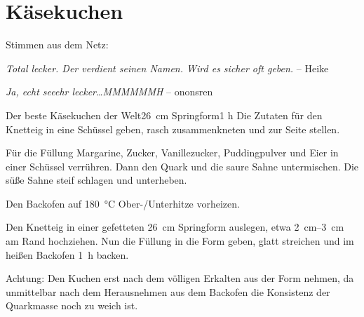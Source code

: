 \section{Käsekuchen}
Stimmen aus dem Netz:\autocite{blondeangel_2008}

\textit{Total lecker. Der verdient seinen Namen. Wird es sicher oft geben.} -- Heike

\textit{Ja, echt seeehr lecker\dots MMMMMMH} -- ononsren

\begin{recipe}{Der beste Käsekuchen der Welt}{\SI{26}{\centi\meter} Springform}{1 h}
    Die Zutaten für den Knetteig in eine Schüssel geben, rasch zusammenkneten und zur Seite stellen.

    Für die Füllung Margarine, Zucker, Vanillezucker, Puddingpulver und Eier in einer Schüssel verrühren. Dann den Quark und die saure Sahne untermischen. Die süße Sahne steif schlagen und unterheben.

    \freeform Den Backofen auf \SI{180}{\celsius} Ober-/Unterhitze vorheizen.

    Den Knetteig in einer gefetteten \SI{26}{\centi\meter} Springform auslegen, etwa \SIrange{2}{3}{\centi\meter} am Rand hochziehen. Nun die Füllung in die Form geben, glatt streichen und im heißen Backofen \SI{1}{\hour} backen.

    \freeform Achtung: Den Kuchen erst nach dem völligen Erkalten aus der Form nehmen, da unmittelbar nach dem Herausnehmen aus dem Backofen die Konsistenz der Quarkmasse noch zu weich ist.

    \freeform\hrulefill
\end{recipe}
